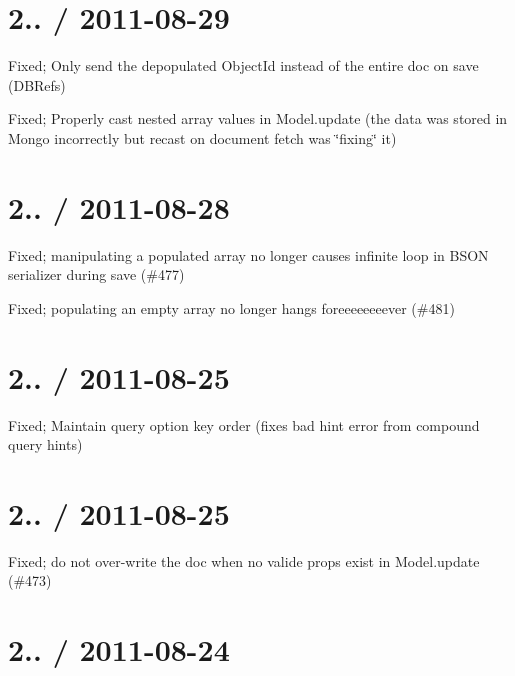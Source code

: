 \section*{2.. / 2011-\/08-\/29 }


\begin{DoxyItemize}
\item Fixed; Only send the depopulated Object\+Id instead of the entire doc on save (D\+B\+Refs)
\item Fixed; Properly cast nested array values in Model.\+update (the data was stored in Mongo incorrectly but recast on document fetch was \char`\"{}fixing\char`\"{} it)
\end{DoxyItemize}

\section*{2.. / 2011-\/08-\/28 }


\begin{DoxyItemize}
\item Fixed; manipulating a populated array no longer causes infinite loop in B\+S\+ON serializer during save (\#477)
\item Fixed; populating an empty array no longer hangs foreeeeeeeever (\#481)
\end{DoxyItemize}

\section*{2.. / 2011-\/08-\/25 }


\begin{DoxyItemize}
\item Fixed; Maintain query option key order (fixes \textquotesingle{}bad hint\textquotesingle{} error from compound query hints)
\end{DoxyItemize}

\section*{2.. / 2011-\/08-\/25 }


\begin{DoxyItemize}
\item Fixed; do not over-\/write the doc when no valide props exist in Model.\+update (\#473)
\end{DoxyItemize}

\section*{2.. / 2011-\/08-\/24 }


